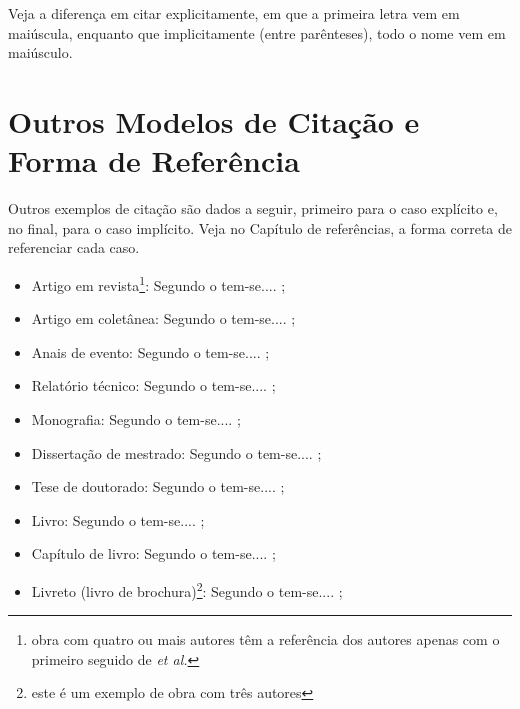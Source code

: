 \documentclass{templateppgmo}
\numberwithin{figure}{chapter}
\numberwithin{table}{chapter}
\numberwithin{quadro}{chapter}
\numberwithin{algoritmo}{chapter}
\numberwithin{codigo}{chapter}
\begin{document}
  	Veja a diferença em citar explicitamente, em que a primeira letra vem em maiúscula, enquanto que implicitamente (entre parênteses), todo o nome vem em maiúsculo. 


  	\section{Outros Modelos de Citação e Forma de Referência}

  	Outros exemplos de citação são dados a seguir, primeiro para o caso explícito e, no final, para o caso implícito. Veja no Capítulo de referências, a forma correta de referenciar cada caso.

  	\begin{itemize}
  	\item Artigo em revista\footnote{obra com quatro ou mais autores têm a referência dos autores apenas com o primeiro seguido de \textit{et al.}}: Segundo o  tem-se.... \cite{silva:artigo,artigo1};

  	\item Artigo em coletânea: Segundo o  tem-se.... \cite{silva:incollection};

  	\item Anais de evento: Segundo o  tem-se.... \cite{silva:inproceedings};

  	\item Relatório técnico: Segundo o  tem-se.... \cite{silva:tech};

  	\item Monografia: Segundo o  tem-se.... \cite{silva:monography};

  	\item Dissertação de mestrado: Segundo o  tem-se.... \cite{silva:master};

  	\item Tese de doutorado: Segundo o  tem-se.... \cite{barcelos1998};

  	
  	\item Livro: Segundo o  tem-se.... \cite{wazlawick:2009};


  	\item Capítulo de livro: Segundo o  tem-se.... \cite{silva:inbook};

  	\item Livreto (livro de brochura)\footnote{este é um exemplo de obra com três autores}: Segundo o  tem-se.... \cite{silva:booklet};


\end{itemize}
\end{document}
